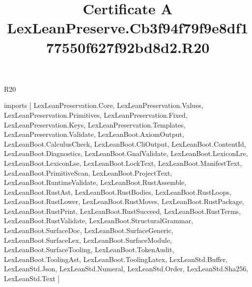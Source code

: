 \begin{lexlean}{R20}
\title{Certificate A LexLeanPreserve.Cb3f94f79f9e8df177550f627f92bd8d2.R20}
\begin{coremodule}
imports [
  LexLeanPreservation.Core,
  LexLeanPreservation.Values,
  LexLeanPreservation.Primitives,
  LexLeanPreservation.Fixed,
  LexLeanPreservation.Keys,
  LexLeanPreservation.Templates,
  LexLeanPreservation.Validate,
  LexLeanBoot.AxiomOutput,
  LexLeanBoot.CalculusCheck,
  LexLeanBoot.CliOutput,
  LexLeanBoot.ContentId,
  LexLeanBoot.Diagnostics,
  LexLeanBoot.GnafValidate,
  LexLeanBoot.LexiconLre,
  LexLeanBoot.LexiconLse,
  LexLeanBoot.LockText,
  LexLeanBoot.ManifestText,
  LexLeanBoot.PrimitiveScan,
  LexLeanBoot.ProjectText,
  LexLeanBoot.RuntimeValidate,
  LexLeanBoot.RustAssemble,
  LexLeanBoot.RustAst,
  LexLeanBoot.RustBodies,
  LexLeanBoot.RustLoops,
  LexLeanBoot.RustLower,
  LexLeanBoot.RustMoves,
  LexLeanBoot.RustPackage,
  LexLeanBoot.RustPrint,
  LexLeanBoot.RustSucceed,
  LexLeanBoot.RustTerms,
  LexLeanBoot.RustValidate,
  LexLeanBoot.StructuralGrammar,
  LexLeanBoot.SurfaceDoc,
  LexLeanBoot.SurfaceGeneric,
  LexLeanBoot.SurfaceLex,
  LexLeanBoot.SurfaceModule,
  LexLeanBoot.SurfaceTooling,
  LexLeanBoot.TokenAudit,
  LexLeanBoot.ToolingAst,
  LexLeanBoot.ToolingLatex,
  LexLeanStd.Buffer,
  LexLeanStd.Json,
  LexLeanStd.Numeral,
  LexLeanStd.Order,
  LexLeanStd.Sha256,
  LexLeanStd.Text
]


\end{coremodule}
\end{lexlean}
